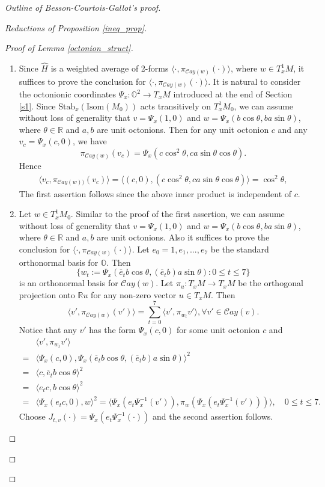 \documentclass{article}
\newcommand{\OO}{\mathbb{O}}
\newcommand{\RR}{\mathbb{R}}
\newcommand{\Cay}{\mathcal{C}ay}
\theoremstyle{definition}
\begin{document}
\begin{proof}[Outline of Besson-Courtois-Gallot's proof]
\begin{proof}[Reductions of Proposition \ref{ineq_prop}]
\begin{proof}[Proof of Lemma \ref{octonion_struct}]
\begin{enumerate}
\item[(P1').] Since $\widehat{H}$ is a weighted average of 2-forms $\langle\cdot,\pi_{\Cay(w)}(\cdot)\rangle$, where $w\in T^1_x M$, it suffices to prove the conclusion for $\langle\cdot,\pi_{\Cay(w)}(\cdot)\rangle$. It is natural to consider the octonionic coordinates $\Psi_x:\OO^2\to T_xM$ introduced at the end of Section \ref{s1}. Since $\mathrm{Stab}_x(\mathrm{Isom}(M_0))$ acts transitively on $T_x^1M_0$, we can assume without loss of generality that $v=\Psi_{x}(1,0)$ and $w=\Psi_{x}(b\cos\theta, ba\sin\theta)$, where $\theta\in\RR$ and $a,b$ are unit octonions. Then for any unit octonion $c$ and any $v_c=\Psi_{x}(c,0)$, we have
$$\pi_{\Cay(w)}(v_c)=\Psi_{x}(c\cos^2\theta,ca\sin\theta\cos\theta).$$
Hence
\begin{align*}
\langle v_c,\pi_{\Cay(w))}(v_c)\rangle=\langle (c,0),(c\cos^2\theta,ca\sin\theta\cos\theta)\rangle=\cos^2\theta,
\end{align*}
The first assertion follows since the above inner product is independent of $c$.
\item[(P2').] Let $w\in T^1_xM_0$. Similar to the proof of the first assertion, we can assume without loss of generality that $v=\Psi_{x}(1,0)$ and $w=\Psi_{x}(b\cos\theta, ba\sin\theta)$, where $\theta\in\RR$ and $a,b$ are unit octonions. Also it suffices to prove the conclusion for $\langle\cdot,\pi_{\Cay(w)}(\cdot)\rangle$.
Let $e_0=1,e_1,...,e_7$ be the standard orthonormal basis for $\OO$. Then 
$$\{w_t:=\Psi_{x}(\overline{e}_tb\cos\theta,(\overline{e}_tb)a\sin\theta):0\leq t\leq 7\}$$ 
is an orthonormal basis for $\Cay(w)$. Let $\pi_u:T_xM\to T_xM$ be the orthogonal projection onto $\RR u$ for any non-zero vector $u\in T_xM$. Then
$$\langle v',\pi_{\Cay(w)}(v')\rangle=\sum_{t=0}^7\langle v',\pi_{w_t}v'\rangle, \forall v'\in\Cay(v).$$
Notice that any $v'$ has the form $\Psi_{x}(c,0)$ for some unit octonion $c$ and
\begin{align*}
&\langle v',\pi_{w_t}v'\rangle\\
=&\langle\Psi_{x}(c,0),\Psi_{x}(\overline{e}_tb\cos\theta,(\overline{e}_tb)a\sin\theta)\rangle^2 \\
=&\langle c,\overline{e}_tb\cos\theta\rangle^2 \\
=&\langle e_tc,b\cos\theta\rangle^2 \\
=&\langle \Psi_{x}(e_tc,0),w\rangle^2 
=\langle \Psi_{x}(e_t\Psi_{x}^{-1}(v')),\pi_w(\Psi_{x}(e_t\Psi_{x}^{-1}(v')))\rangle,\quad 0\leq t\leq 7.
\end{align*}
Choose $J_{t,v}(\cdot)=\Psi_{x}(e_t\Psi_{x}^{-1}(\cdot))$ and the second assertion follows.\qedhere
\end{enumerate}
\end{proof}


\end{proof}
\end{proof}
\end{document}
